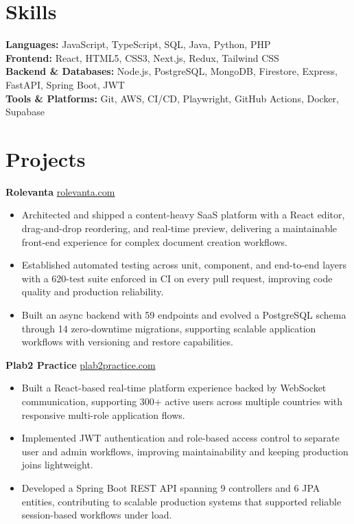 \documentclass[11pt]{article}       %
\begin{document}
\vspace{-10.5pt}

\section*{Skills}
\textbf{Languages:} JavaScript, TypeScript, SQL, Java, Python, PHP \\
\textbf{Frontend:} React, HTML5, CSS3, Next.js, Redux, Tailwind CSS \\
\textbf{Backend \& Databases:} Node.js, PostgreSQL, MongoDB, Firestore, Express, FastAPI, Spring Boot, JWT \\
\textbf{Tools \& Platforms:} Git, AWS, CI/CD, Playwright, GitHub Actions, Docker, Supabase
\vspace{-5pt}






\section*{Projects}
\textbf{Rolevanta} \hfill \href{https://rolevanta.com}{rolevanta.com} \\
\vspace{-9pt}
\begin{itemize}
  \item Architected and shipped a content-heavy SaaS platform with a React editor, drag-and-drop reordering, and real-time preview, delivering a maintainable front-end experience for complex document creation workflows.
  \item Established automated testing across unit, component, and end-to-end layers with a 620-test suite enforced in CI on every pull request, improving code quality and production reliability.
  \item Built an async backend with 59 endpoints and evolved a PostgreSQL schema through 14 zero-downtime migrations, supporting scalable application workflows with versioning and restore capabilities.
\end{itemize}

\textbf{Plab2 Practice} \hfill \href{https://plab2practice.com}{plab2practice.com} \\
\vspace{-9pt}
\begin{itemize}
  \item Built a React-based real-time platform experience backed by WebSocket communication, supporting 300+ active users across multiple countries with responsive multi-role application flows.
  \item Implemented JWT authentication and role-based access control to separate user and admin workflows, improving maintainability and keeping production joins lightweight.
  \item Developed a Spring Boot REST API spanning 9 controllers and 6 JPA entities, contributing to scalable production systems that supported reliable session-based workflows under load.
\end{itemize}
\end{document}
